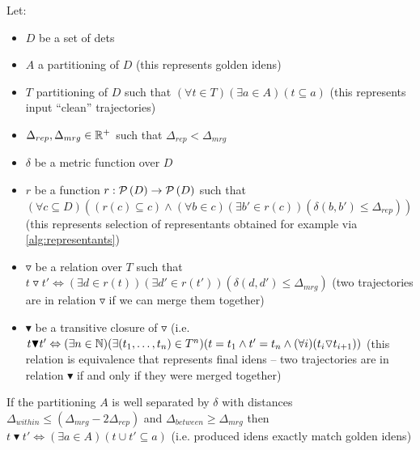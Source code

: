 \begin{claim}
\label{clm:claim}
Let:

\setlength{\itemsep}{0pt}
\setlength{\parskip}{0pt}

\begin{itemize}
    \item $D$ be a set of \glspl{det}
    \item $A$ a partitioning of $D$ (this represents golden \glspl{iden})
    \item $T$ partitioning of $D$ such that $(\forall t \in T) (\exists a \in A) (t \subseteq a)$ (this represents input ``clean'' trajectories)
    \item $\Delta_{rep}, \Delta_{mrg} \in \mathbb{R}^+$ such that $\Delta_{rep} < \Delta_{mrg}$
    \item $\delta$ be a metric function over $D$
    \item $r$ be a function $r: \mathcal{P}\left(D\right) \rightarrow \mathcal{P}\left(D\right)$ such that $(\forall c \subseteq D)((r(c) \subseteq c) \land (\forall b \in c) (\exists b' \in r(c)) (\delta(b, b') \leq \Delta_{rep}))$ (this represents selection of representants obtained for example via \autoref{alg:representants})
    \item $\triangledown$ be a relation over $T$ such that $t\triangledown t' \Leftrightarrow (\exists d \in r(t)) (\exists d' \in r(t')) (\delta(d, d') \leq \Delta_{mrg})$ (two trajectories are in relation $\triangledown$ if we can merge them together)
    \item $\blacktriangledown$ be a transitive closure of $\triangledown$ (i.e. $t \blacktriangledown t' \Leftrightarrow (\exists n \in \mathbb{N}) (\exists (t_1, \ldots, t_n) \in T^n) (t = t_1 \land t' = t_n \land (\forall i) (t_i\triangledown t_{i+1}))$ (this relation is equivalence that represents final \glspl{iden} -- two trajectories are in relation $\blacktriangledown$ if and only if they were merged together)
\end{itemize}

If the partitioning $A$ is well separated by $\delta$ with distances $\Delta_{within} \leq (\Delta_{mrg} - 2\Delta_{rep})$ and $\Delta_{between} \geq \Delta_{mrg}$ then $t\blacktriangledown t' \Leftrightarrow (\exists a \in A) (t \cup t' \subseteq a)$ (i.e. produced \glspl{iden} exactly match golden \glspl{iden})

\end{claim}

